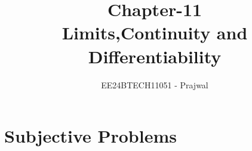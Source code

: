 \documentclass[journal,12pt,twocolumn]{IEEEtran}
\theoremstyle{remark}
\begin{document}

\vspace{3cm}

\title{Chapter-11\\
        Limits,Continuity and \\ Differentiability}
\author{EE24BTECH11051 - Prajwal}
\maketitle
\newpage
\bigskip

\renewcommand{\thefigure}{\theenumi}
\renewcommand{\thetable}{\theenumi}


\section{Subjective Problems}
   
\end{document}
